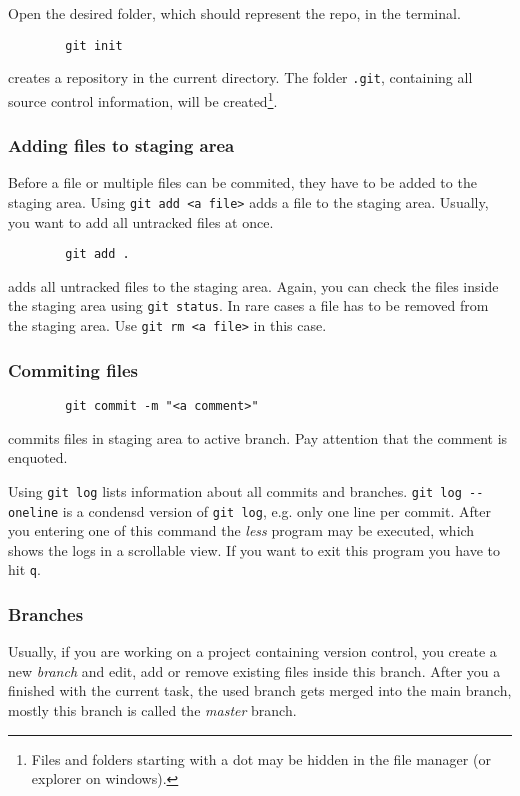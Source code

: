 \documentclass[12pt, twoside]{article}
\begin{document}
	Open the desired folder, which should represent the repo, in the terminal.
	\begin{verbatim}
		git init
	\end{verbatim}
	creates a repository in the current directory. The folder \verb|.git|, containing all source control information, will be created\footnote{Files and folders starting with a dot may be hidden in the file manager (or explorer on windows).}.
	
	\subsubsection{Adding files to staging area}
	
	Before a file or multiple files can be commited, they have to be added to the staging area. Using \verb|git add <a file>| adds a file to the staging area. Usually, you want to add all untracked files at once. 
	\begin{verbatim}
		git add .
	\end{verbatim}
	adds all untracked files to the staging area. Again, you can check the files inside the staging area using \verb|git status|. In rare cases a file has to be removed from the staging area. Use \verb|git rm <a file>| in this case.
	
	\subsubsection{Commiting files}
	
	\begin{verbatim}
		git commit -m "<a comment>"
	\end{verbatim}
	commits files in staging area to active branch. Pay attention that the comment is enquoted.
	
	Using \verb|git log| lists information about all commits and branches. \verb|git log --oneline| is a condensd version of \verb|git log|, e.g. only one line per commit. After you entering one of this command the \textit{less} program may be executed, which shows the logs in a scrollable view. If you want to exit this program you have to hit \verb|q|.
	
	\subsubsection{Branches}
	
	Usually, if you are working on a project containing version control, you create a new \textit{branch} and edit, add or remove existing files inside this branch. After you a finished with the current task, the used branch gets merged into the main branch, mostly this branch is called the \textit{master} branch.
	
\end{document}
